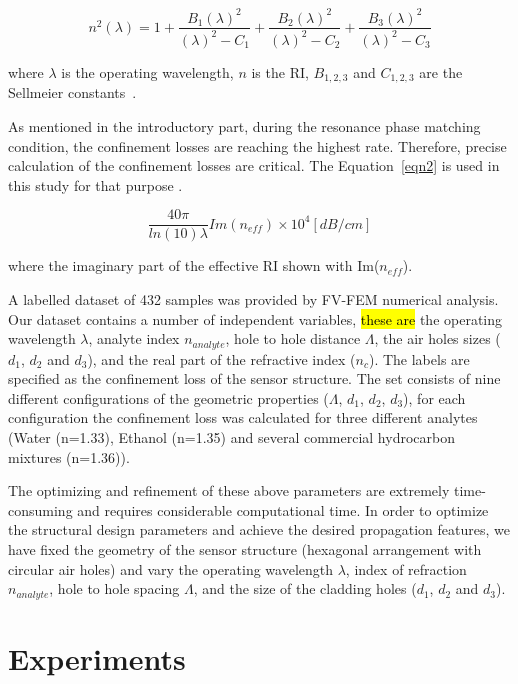 \documentclass[10pt]{IEEEtran}
\begin{document}
\begin{equation}
n^2(\lambda)=1+\frac{ B_1 (\lambda)^2} {(\lambda)^2-C_1} + \frac{ B_2 (\lambda)^2} {(\lambda)^2-C_2} + \frac{ B_3 (\lambda)^2} {(\lambda)^2-C_3}
\label{eqn1}
\end{equation}

where $\lambda$ is the operating wavelength, $n$ is the RI, $B_{1,2,3}$ and  $C_{1,2,3}$ are the  Sellmeier constants~\cite{bjarklev2003PCF}.

As mentioned in the introductory part, during the resonance phase matching condition, the confinement losses are reaching the highest rate. Therefore, precise calculation of the confinement losses are critical.  The Equation~\ref{eqn2} is used in this study for that purpose \cite{yasli2019effect}.



\begin{equation}
\frac{40\pi}{ln(10) \lambda} Im(n_{eff}) \times 10^{4} [dB/cm]
\label{eqn2}
\end{equation}

where the imaginary part of the effective RI shown with Im($n_{eff}$).

A labelled dataset of 432 samples was provided by FV-FEM numerical analysis. Our dataset contains a number of independent variables, \hl{these are} the operating wavelength $\lambda$, analyte index $n_{analyte}$, hole to hole distance $\Lambda$, the air holes sizes ($d_1$, $d_2$ and $d_3$), and the real part of the refractive index ($n_c$). The labels are specified as the confinement loss of the sensor structure. The set consists of nine different configurations of the geometric properties ($\Lambda$, $d_1$, $d_2$, $d_3$), for each configuration the confinement loss was calculated for three different analytes (Water (n=1.33), Ethanol (n=1.35) and several commercial hydrocarbon mixtures (n=1.36)).

The optimizing and refinement of these above parameters are extremely time-consuming and requires considerable computational time. In order to optimize the structural design parameters and achieve the desired propagation features, we have fixed the geometry of the sensor structure (hexagonal arrangement with circular air holes) and vary the operating wavelength $\lambda$, index of refraction $n_{analyte}$, hole to hole spacing $\Lambda$, and the size of the cladding holes ($d_1$, $d_2$ and $d_3$).


\section{Experiments}
\label{sec:exp}
\end{document}
